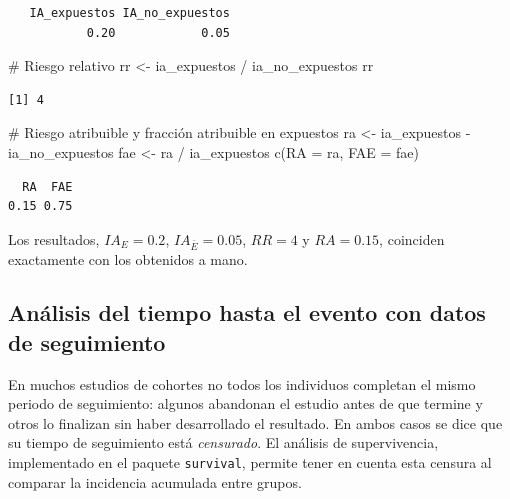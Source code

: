 \documentclass[
  spanish,
  a4paper,
]{scrreport}
\newenvironment{Shaded}{\begin{snugshade}}{\end{snugshade}}
\newcommand{\AttributeTok}[1]{\textcolor[rgb]{0.40,0.45,0.13}{#1}}
\newcommand{\CommentTok}[1]{\textcolor[rgb]{0.37,0.37,0.37}{#1}}
\newcommand{\FunctionTok}[1]{\textcolor[rgb]{0.28,0.35,0.67}{#1}}
\newcommand{\NormalTok}[1]{\textcolor[rgb]{0.00,0.23,0.31}{#1}}
\newcommand{\OtherTok}[1]{\textcolor[rgb]{0.00,0.23,0.31}{#1}}
\newcommand{\SpecialCharTok}[1]{\textcolor[rgb]{0.37,0.37,0.37}{#1}}
\theoremstyle{definition}
\theoremstyle{definition}
\theoremstyle{remark}
\begin{document}
\begin{verbatim}
   IA_expuestos IA_no_expuestos 
           0.20            0.05 
\end{verbatim}

\begin{Shaded}
\begin{Highlighting}[]
\CommentTok{\# Riesgo relativo}
\NormalTok{rr }\OtherTok{\textless{}{-}}\NormalTok{ ia\_expuestos }\SpecialCharTok{/}\NormalTok{ ia\_no\_expuestos}
\NormalTok{rr}
\end{Highlighting}
\end{Shaded}

\begin{verbatim}
[1] 4
\end{verbatim}

\begin{Shaded}
\begin{Highlighting}[]
\CommentTok{\# Riesgo atribuible y fracción atribuible en expuestos}
\NormalTok{ra }\OtherTok{\textless{}{-}}\NormalTok{ ia\_expuestos }\SpecialCharTok{{-}}\NormalTok{ ia\_no\_expuestos}
\NormalTok{fae }\OtherTok{\textless{}{-}}\NormalTok{ ra }\SpecialCharTok{/}\NormalTok{ ia\_expuestos}
\FunctionTok{c}\NormalTok{(}\AttributeTok{RA =}\NormalTok{ ra, }\AttributeTok{FAE =}\NormalTok{ fae)}
\end{Highlighting}
\end{Shaded}

\begin{verbatim}
  RA  FAE 
0.15 0.75 
\end{verbatim}

Los resultados, \(IA_E=0.2\), \(IA_{\bar E}=0.05\), \(RR=4\) y
\(RA=0.15\), coinciden exactamente con los obtenidos a mano.

\subsection{Análisis del tiempo hasta el evento con datos de
seguimiento}\label{anuxe1lisis-del-tiempo-hasta-el-evento-con-datos-de-seguimiento}

En muchos estudios de cohortes no todos los individuos completan el
mismo periodo de seguimiento: algunos abandonan el estudio antes de que
termine y otros lo finalizan sin haber desarrollado el resultado. En
ambos casos se dice que su tiempo de seguimiento está \emph{censurado}.
El análisis de supervivencia, implementado en el paquete
\texttt{survival}, permite tener en cuenta esta censura al comparar la
incidencia acumulada entre grupos.
\end{document}
